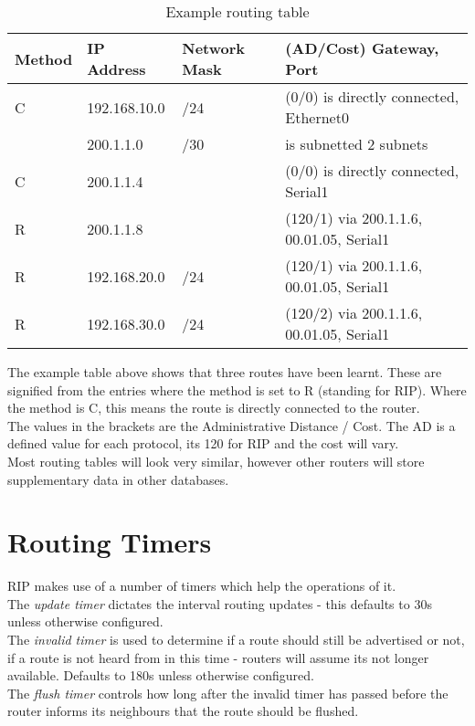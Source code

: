 \begin{table}[H]
    \centering
    {\RaggedRight
    \begin{tabular}{p{} p{} p{} p{}}
    \textbf{Method} & \textbf{IP Address} & \textbf{Network Mask} & \textbf{(AD/Cost) Gateway, Port}\\
    \hline
    \hline
    C & 192.168.10.0 & /24 & (0/0) is directly connected, Ethernet0\\
    \hline
     & 200.1.1.0 & /30 & is subnetted 2 subnets\\
    \hline
    C & 200.1.1.4 &  & (0/0) is directly connected, Serial1\\
    \hline
    R & 200.1.1.8 &  & (120/1) via 200.1.1.6, 00.01.05, Serial1\\
    \hline
    R & 192.168.20.0 & /24 & (120/1) via 200.1.1.6, 00.01.05, Serial1\\
    \hline
    R & 192.168.30.0 & /24 & (120/2) via 200.1.1.6, 00.01.05, Serial1\\
    \hline
    \end{tabular}
    } %
    \caption{Example routing table}
\end{table}

The example table above shows that three routes have been learnt. These are signified from the entries where the method is set to R (standing for RIP). Where the method is C, this means the route is directly connected to the router.\\

The values in the brackets are the Administrative Distance / Cost. The AD is a defined value for each protocol, its 120 for RIP and the cost will vary.\\

Most routing tables will look very similar, however other routers will store supplementary data in other databases. 

\section{Routing Timers}
RIP makes use of a number of timers which help the operations of it.\\ The \textit{update timer} dictates the interval routing updates - this defaults to 30s unless otherwise configured.\\ The \textit{invalid timer} is used to determine if a route should still be advertised or not, if a route is not heard from in this time - routers will assume its not longer available. Defaults to 180s unless otherwise configured.\\ The \textit{flush timer} controls how long after the invalid timer has passed before the router informs its neighbours that the route should be flushed.

